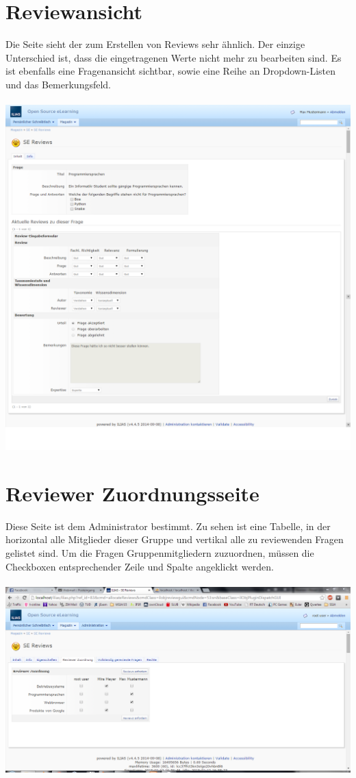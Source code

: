 \documentclass[12pt,a4paper]{scrreprt}
\begin{document}
\section{Reviewansicht}
Die Seite sieht der zum Erstellen von Reviews sehr ähnlich. Der einzige Unterschied ist, dass die eingetragenen Werte nicht mehr zu bearbeiten sind. Es ist ebenfalls eine Fragenansicht sichtbar, sowie  eine Reihe an Dropdown-Listen und das Bemerkungsfeld. \\
\\
\includegraphics[width=1.0\textwidth]{reviewausgabe.png}

\section{Reviewer Zuordnungsseite}
Diese Seite ist dem Administrator bestimmt. Zu sehen ist eine Tabelle, in der horizontal alle Mitglieder dieser Gruppe und vertikal alle zu reviewenden Fragen gelistet sind. Um die Fragen Gruppenmitgliedern zuzuordnen, müssen die Checkboxen entsprechender Zeile und Spalte angeklickt werden. \\
\\
\includegraphics[width=1.0\textwidth]{reviewer_zuordnen.png}
\end{document}

